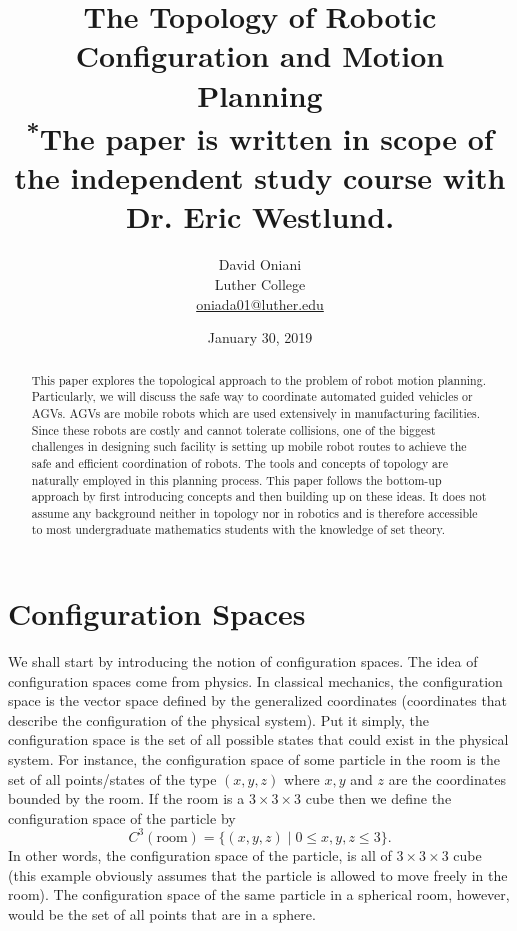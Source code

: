 \documentclass[12pt]{article}
\title{\textbf{The Topology of Robotic Configuration and Motion Planning}\\
{\small \textsuperscript{*}The paper is written in scope of the independent study course with Dr. Eric Westlund.}}
\author{David Oniani\\Luther College\\\href{mailto:oniada01@luther.edu}{oniada01@luther.edu}}
\date{January 30, 2019}
\theoremstyle{definition}
\begin{document}
\maketitle


\begin{abstract}

\noindent This paper explores the topological approach to the problem
of robot motion planning. Particularly, we will discuss
the safe way to coordinate automated guided vehicles or AGVs.
AGVs are mobile robots which are used extensively in manufacturing
facilities. Since these robots are costly and cannot tolerate collisions,
one of the biggest challenges in designing such facility is setting up
mobile robot routes to achieve the safe and efficient coordination of robots.
The tools and concepts of topology are naturally employed in this planning
process. This paper follows the bottom-up approach by first introducing
concepts and then building up on these ideas. It does not assume any background
neither in topology nor in robotics and is therefore accessible to most undergraduate
mathematics students with the knowledge of set theory.
\end{abstract}


\newpage
\tableofcontents
\newpage


\section*{\centering Configuration Spaces}

We shall start by introducing the notion of configuration spaces.
The idea of configuration spaces come from physics. In classical mechanics,
the configuration space is the vector space defined by the generalized
coordinates (coordinates that describe the configuration of the physical system).
Put it simply, the configuration space is the set of all possible states that
could exist in the physical system. For instance, the configuration space of some
particle in the room is the set of all points/states of the type $(x, y, z)$ where
$x, y$ and $z$ are the coordinates bounded by the room. If the room is a $3 \times 3 \times 3$
cube then we define the configuration space of the particle by
$$C^3(\text{room}) = \{(x, y, z) \mid 0 \leq x, y, z \leq 3\}.$$
In other words, the configuration space of the particle, is all of $3 \times 3 \times 3$ cube
(this example obviously assumes that the particle is allowed to move freely in the room).
The configuration space of the same particle in a spherical room, however, would be the set of all
points that are in a sphere.
\end{document}

